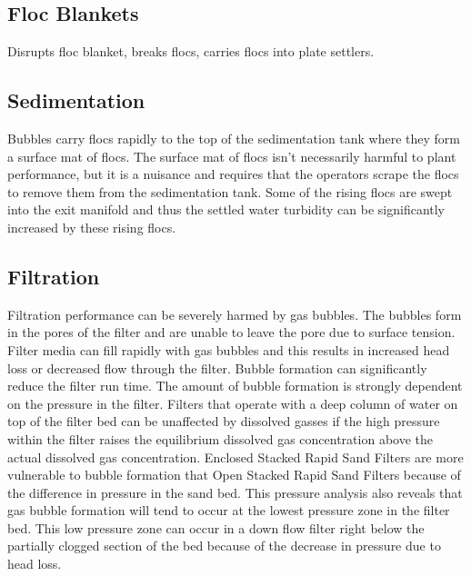 \documentclass[letterpaper,10pt,english]{sphinxmanual}
\begin{document}
\subsection{Floc Blankets}
\label{\detokenize{Dissolved_Gas/DG_Intro:floc-blankets}}\label{\detokenize{Dissolved_Gas/DG_Intro:heading-dg-floc-blankets}}
Disrupts floc blanket, breaks flocs, carries flocs into plate settlers.


\subsection{Sedimentation}
\label{\detokenize{Dissolved_Gas/DG_Intro:sedimentation}}\label{\detokenize{Dissolved_Gas/DG_Intro:heading-dg-sedimentation}}
Bubbles carry flocs rapidly to the top of the sedimentation tank where they form a surface mat of flocs. The surface mat of flocs isn’t necessarily harmful to plant performance, but it is a nuisance and requires that the operators scrape the flocs to remove them from the sedimentation tank. Some of the rising flocs are swept into the exit manifold and thus the settled water turbidity can be significantly increased by these rising flocs.


\subsection{Filtration}
\label{\detokenize{Dissolved_Gas/DG_Intro:filtration}}\label{\detokenize{Dissolved_Gas/DG_Intro:heading-dg-filtration}}
Filtration performance can be severely harmed by gas bubbles. The bubbles form in the pores of the filter and are unable to leave the pore due to surface tension. Filter media can fill rapidly with gas bubbles and this results in increased head loss or decreased flow through the filter. Bubble formation can significantly reduce the filter run time. The amount of bubble formation is strongly dependent on the pressure in the filter. Filters that operate with a deep column of water on top of the filter bed can be unaffected by dissolved gasses if the high pressure within the filter raises the equilibrium dissolved gas concentration above the actual dissolved gas concentration. Enclosed Stacked Rapid Sand Filters are more vulnerable to bubble formation that Open Stacked Rapid Sand Filters because of the difference in pressure in the sand bed. This pressure analysis also reveals that gas bubble formation will tend to occur at the lowest pressure zone in the filter bed. This low pressure zone can occur in a down flow filter right below the partially clogged section of the bed because of the decrease in pressure due to head loss.
\end{document}

